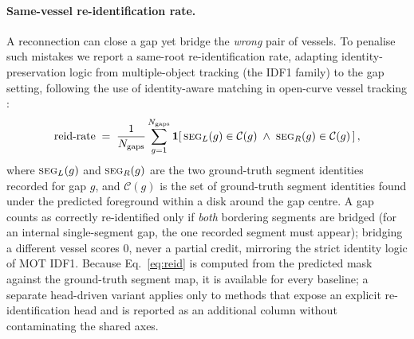 \paragraph{Same-vessel re-identification rate.} A reconnection can close a
gap yet bridge the \emph{wrong} pair of vessels. To penalise such mistakes we
report a same-root re-identification rate, adapting identity-preservation
logic from multiple-object tracking (the IDF1 family) to the gap setting,
following the use of identity-aware matching in open-curve vessel tracking
\cite{TODO_snaketracker}:
\begin{equation}
  \mathrm{reid\text{-}rate}
  \;=\;
  \frac{1}{N_{\text{gaps}}}
  \sum_{g=1}^{N_{\text{gaps}}}
  \mathbf{1}\!\left[\,
    \textsc{seg}_L(g)\in\mathcal{C}(g)
    \;\wedge\;
    \textsc{seg}_R(g)\in\mathcal{C}(g)
  \,\right],
  \label{eq:reid}
\end{equation}
where $\textsc{seg}_L(g)$ and $\textsc{seg}_R(g)$ are the two ground-truth
segment identities recorded for gap $g$, and $\mathcal{C}(g)$ is the set of
ground-truth segment identities found under the predicted foreground within a
disk around the gap centre. A gap counts as correctly re-identified only if
\emph{both} bordering segments are bridged (for an internal single-segment
gap, the one recorded segment must appear); bridging a different vessel scores
$0$, never a partial credit, mirroring the strict identity logic of MOT IDF1.
Because Eq.~\eqref{eq:reid} is computed from the predicted mask against the
ground-truth segment map, it is available for every baseline; a separate
head-driven variant applies only to methods that expose an explicit
re-identification head and is reported as an additional column without
contaminating the shared axes.

